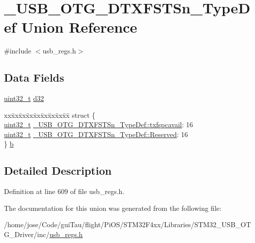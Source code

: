 \hypertarget{union___u_s_b___o_t_g___d_t_x_f_s_t_sn___type_def}{\section{\-\_\-\-U\-S\-B\-\_\-\-O\-T\-G\-\_\-\-D\-T\-X\-F\-S\-T\-Sn\-\_\-\-Type\-Def Union Reference}
\label{union___u_s_b___o_t_g___d_t_x_f_s_t_sn___type_def}
}


{\ttfamily \#include $<$usb\-\_\-regs.\-h$>$}

\subsection*{Data Fields}
\begin{DoxyCompactItemize}
\item 
\hyperlink{stdint_8h_a435d1572bf3f880d55459d9805097f62}{uint32\-\_\-t} \hyperlink{group___u_s_b___o_t_g___d_r_i_v_e_r_ga4862ebb577ee8e26382e28909ab0c275}{d32}
\item 
\begin{tabbing}
xx\=xx\=xx\=xx\=xx\=xx\=xx\=xx\=xx\=\kill
struct \{\\
\>\hyperlink{stdint_8h_a435d1572bf3f880d55459d9805097f62}{uint32\_t} \hyperlink{group___u_s_b___o_t_g___d_r_i_v_e_r_ga8c5fd712fbdfea0b80c533af69d25f33}{\_USB\_OTG\_DTXFSTSn\_TypeDef::txfspcavail}: 16\\
\>\hyperlink{stdint_8h_a435d1572bf3f880d55459d9805097f62}{uint32\_t} \hyperlink{group___u_s_b___o_t_g___d_r_i_v_e_r_gac897a0ce4a1b6cdba39c3fcf36948dc8}{\_USB\_OTG\_DTXFSTSn\_TypeDef::Reserved}: 16\\
\} \hyperlink{group___u_s_b___o_t_g___d_r_i_v_e_r_ga72a3d9f86c27e387f27aaa1b1b5dc7cb}{b}\\

\end{tabbing}\end{DoxyCompactItemize}


\subsection{Detailed Description}


Definition at line 609 of file usb\-\_\-regs.\-h.



The documentation for this union was generated from the following file\-:\begin{DoxyCompactItemize}
\item 
/home/jose/\-Code/gui\-Tau/flight/\-Pi\-O\-S/\-S\-T\-M32\-F4xx/\-Libraries/\-S\-T\-M32\-\_\-\-U\-S\-B\-\_\-\-O\-T\-G\-\_\-\-Driver/inc/\hyperlink{_s_t_m32_f4xx_2_libraries_2_s_t_m32___u_s_b___o_t_g___driver_2inc_2usb__regs_8h}{usb\-\_\-regs.\-h}\end{DoxyCompactItemize}
